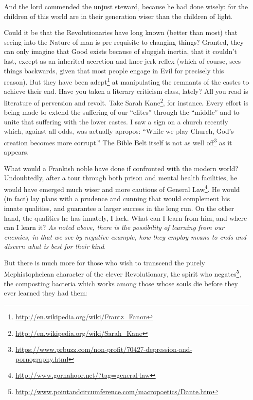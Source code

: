 \begin{quotex}
And the lord commended the unjust steward, because he had done wisely: for the children of this world are in their generation wiser than the children of light. 
\end{quotex}


Could it be that the Revolutionaries have long known (better than most) that seeing into the Nature of man is pre-requisite to changing things? Granted, they can only imagine that Good exists because of sluggish inertia, that it couldn't last, except as an inherited accretion and knee-jerk reflex (which of course, sees things backwards, given that most people engage in Evil for precisely this reason). But they have been adept\footnote{\url{http://en.wikipedia.org/wiki/Frantz\_Fanon}} at manipulating the remnants of the castes to achieve their end. Have you taken a literary criticism class, lately? All you read is literature of perversion and revolt. Take Sarah Kane\footnote{\url{http://en.wikipedia.org/wiki/Sarah\_Kane}}, for instance. Every effort is being made to extend the suffering of our ``elites'' through the ``middle'' and to unite that suffering with the lower castes. I saw a sign on a church recently which, against all odds, was actually apropos: ``While we play Church, God's creation becomes more corrupt.'' The Bible Belt itself is not as well off\footnote{\url{https://www.prbuzz.com/non-profit/70427-depression-and-pornography.html}} as it appears.

What would a Frankish noble have done if confronted with the modern world? Undoubtedly, after a tour through both prison and mental health facilities, he would have emerged much wiser and more cautious of General Law\footnote{\url{http://www.gornahoor.net/?tag=general-law}}. He would (in fact) lay plans with a prudence and cunning that would complement his innate qualities, and guarantee a larger success in the long run. On the other hand, the qualities he has innately, I lack. What can I learn from him, and where can I learn it? \emph{As noted above, there is the possibility of learning from our enemies, in that we see by negative example, how they employ means to ends and discern what is best for their kind}.

But there is much more for those who wish to transcend the purely Mephistophelean character of the clever Revolutionary, the spirit who negates\footnote{\url{http://www.pointandcircumference.com/macropoetics/Dante.htm}}, the composting bacteria which works among those whose souls die before they ever learned they had them:

